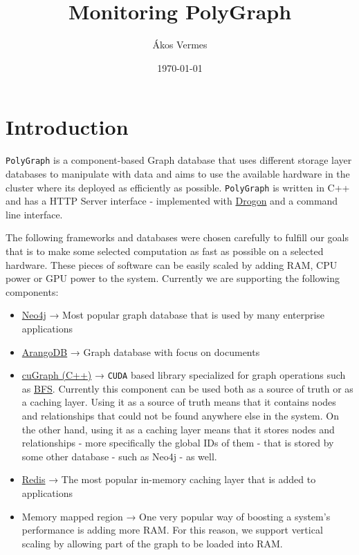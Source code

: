 \documentclass[11pt,a4paper]{article}
\title{Monitoring PolyGraph}
\author{Ákos Vermes}
\date{\today}
\begin{document}
\maketitle
\tableofcontents
\newpage

\section{Introduction}

\texttt{PolyGraph} is a component-based Graph database that uses different storage layer databases to manipulate with data and aims to use the available hardware in the cluster where its deployed as efficiently as possible. \texttt{PolyGraph} is written in C++ and has a HTTP Server interface - implemented with \href{https://drogon.org/}{Drogon} and a command line interface.

The following frameworks and databases were chosen carefully to fulfill our goals that is to make some selected computation as fast as possible on a selected hardware. These pieces of software can be easily scaled by adding RAM, CPU power or GPU power to the system. Currently we are supporting the following components:

\begin{itemize}
    \item \href{https://neo4j.com/}{Neo4j} → Most popular graph database that is used by many enterprise applications
    \item \href{https://arangodb.com/}{ArangoDB} → Graph database with focus on documents
    \item \href{https://rapids.ai/cugraph/}{cuGraph (C++)} → \texttt{CUDA} based library specialized for graph operations such as \href{https://en.wikipedia.org/wiki/Breadth-first_search}{BFS}. Currently this component can be used both as a source of truth or as a caching layer.  Using it as a source of truth means that it contains nodes and relationships that could not be found anywhere else in the system. On the other hand, using it as a caching layer means that it stores nodes and relationships - more specifically the global IDs of them - that is stored by some other database - such as Neo4j - as well. 
     \item \href{https://redis.io/}{Redis} → The most popular in-memory caching layer that is added to applications
     \item Memory mapped region → One very popular way of boosting a system's performance is adding more RAM. For this reason, we support vertical scaling by allowing part of the graph to be loaded into RAM.
\end{itemize}
\end{document}
